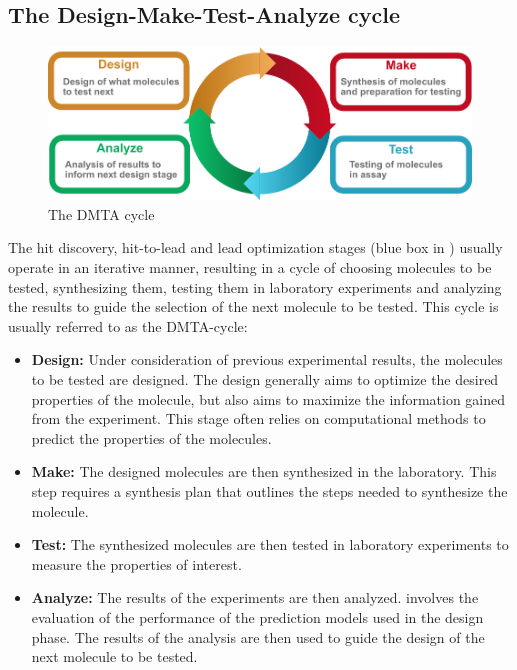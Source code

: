 \subsection{The Design-Make-Test-Analyze cycle}
\begin{figure}
      \centering
      \includegraphics[width=\textwidth]{figures/dmta_cycle.pdf}
      \caption{The DMTA cycle}
\end{figure}
The hit discovery, hit-to-lead and lead optimization stages (blue box in
) usually operate in an iterative manner, resulting in a cycle of
choosing molecules to be tested, synthesizing them, testing them in laboratory experiments and analyzing the
results to guide the selection of the next molecule to be tested. This cycle is usually referred to as the
\ac{DMTA}-cycle:
\begin{itemize}
      \item \textbf{Design:} Under consideration of previous experimental results, the molecules to be tested
            are designed. The design generally aims to optimize the desired properties of the molecule, but
            also aims to maximize the information gained from the experiment. This stage often relies on
            computational methods to predict the properties of the molecules.
      \item \textbf{Make:} The designed molecules are then synthesized in the laboratory. This step requires
            a synthesis plan that outlines the steps needed to synthesize the molecule.
      \item \textbf{Test:} The synthesized molecules are then tested in laboratory experiments to
            measure the properties of interest.
      \item \textbf{Analyze:} The results of the experiments are then analyzed.
            involves the evaluation of the performance of the prediction models used in the design
            phase. The results of the analysis are then used to guide the design of the next molecule
            to be tested.
\end{itemize}


